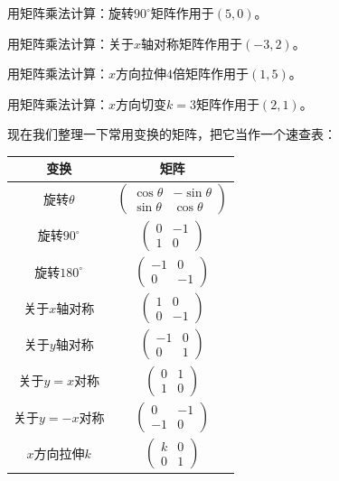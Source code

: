 \documentclass[a4paper,12pt]{ctexart}
\begin{document}
\begin{exercise}[矩阵×向量练习]
\item 用矩阵乘法计算：旋转$90^\circ$矩阵作用于$(5,0)$。
\item 用矩阵乘法计算：关于$x$轴对称矩阵作用于$(-3,2)$。
\item 用矩阵乘法计算：$x$方向拉伸$4$倍矩阵作用于$(1,5)$。
\item 用矩阵乘法计算：$x$方向切变$k=3$矩阵作用于$(2,1)$。
\end{exercise}

现在我们整理一下常用变换的矩阵，把它当作一个速查表：

\begin{center}
\begin{tabular}{c|c}
\textbf{变换} & \textbf{矩阵}\\\hline
旋转$\theta$ & $\begin{pmatrix}\cos\theta&-\sin\theta\\\sin\theta&\cos\theta\end{pmatrix}$\\
旋转$90^\circ$ & $\begin{pmatrix}0&-1\\1&0\end{pmatrix}$\\
旋转$180^\circ$ & $\begin{pmatrix}-1&0\\0&-1\end{pmatrix}$\\
关于$x$轴对称 & $\begin{pmatrix}1&0\\0&-1\end{pmatrix}$\\
关于$y$轴对称 & $\begin{pmatrix}-1&0\\0&1\end{pmatrix}$\\
关于$y=x$对称 & $\begin{pmatrix}0&1\\1&0\end{pmatrix}$\\
关于$y=-x$对称 & $\begin{pmatrix}0&-1\\-1&0\end{pmatrix}$\\
$x$方向拉伸$k$ & $\begin{pmatrix}k&0\\0&1\end{pmatrix}$\\

\end{tabular}
\end{center}
\end{document}
